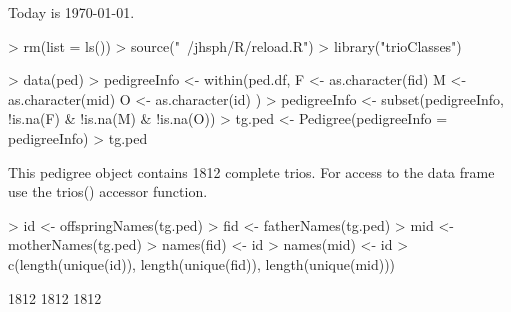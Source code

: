 \documentclass[10pt]{article}
\begin{document}
\setlength{\parskip}{0.2\baselineskip}
\setlength{\parindent}{0pt}
Today is \today.
\begin{Schunk}
\begin{Sinput}
> rm(list = ls())
> source("~/jhsph/R/reload.R")
> library("trioClasses")
\end{Sinput}
\end{Schunk}
\begin{Schunk}
\begin{Sinput}
> data(ped)
> pedigreeInfo <- within(ped.df, {
     F <- as.character(fid)
     M <- as.character(mid)
     O <- as.character(id)
 })
> pedigreeInfo <- subset(pedigreeInfo, !is.na(F) & !is.na(M) & 
     !is.na(O))
> tg.ped <- Pedigree(pedigreeInfo = pedigreeInfo)
> tg.ped
\end{Sinput}
\begin{Soutput}
This pedigree object contains 1812 complete trios.
For access to the data frame use the trios() accessor function.
\end{Soutput}
\end{Schunk}
\begin{Schunk}
\begin{Sinput}
> id <- offspringNames(tg.ped)
> fid <- fatherNames(tg.ped)
> mid <- motherNames(tg.ped)
> names(fid) <- id
> names(mid) <- id
> c(length(unique(id)), length(unique(fid)), length(unique(mid)))
\end{Sinput}
\begin{Soutput}
[1] 1812 1812 1812
\end{Soutput}
\end{Schunk}
\end{document}
